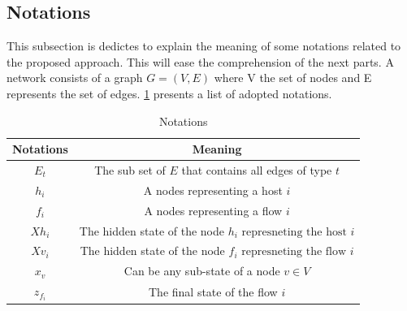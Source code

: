 \subsection{Notations}
This subsection is dedictes to explain the meaning of some notations related to the proposed approach. This will ease the comprehension of the next parts. 
A network consists of a graph $G =(V, E)$ where V the set of nodes and E represents the set of edges. \ref{table:notations} presents a list of adopted notations.
\begin{table}[H]
\centering
\begin{tabular}{|c|c|}
\hline
Notations & Meaning \\
\hline
$E_t$ & The sub set of $E$ that contains all edges of type $t$\\
\hline
$h_i$ & A nodes representing a host $i$\\
\hline
$f_i$ & A nodes representing a flow $i$\\
\hline
$Xh_i$ & The hidden state of the node $h_i \text{ represneting the host } i$\\
\hline
$Xv_i$ & The hidden state of the node $f_i \text{ represneting the flow } i$\\
\hline
$x_v$ & Can be any sub-state of a node $v \in V$\\
\hline
$z_{f_i}$ & The final state of the flow $i$ \\
\hline
\end{tabular}
\caption{Notations}
\label{table:notations}
\end{table}

